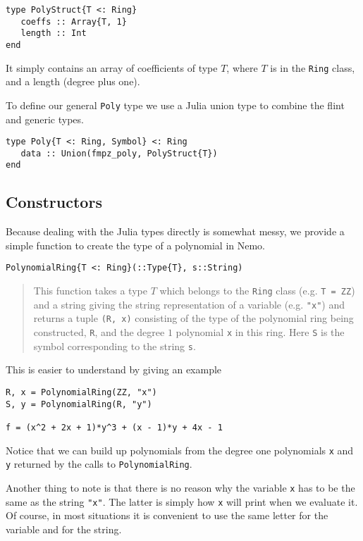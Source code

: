 \documentclass[a4paper,10pt]{article}
\newcommand{\code}{\lstinline}
\newcommand{\desc}[1]{\vspace{-3mm}\begin{quote}#1\end{quote}}
\begin{document}
{{{\begin{lstlisting}
type PolyStruct{T <: Ring}
   coeffs :: Array{T, 1}
   length :: Int
end
\end{lstlisting}

It simply contains an array of coefficients of type $T$, where $T$ is in the \code{Ring}
class, and a length (degree plus one).

To define our general \code{Poly} type we use a Julia union type to combine the flint
and generic types.

\begin{lstlisting}
type Poly{T <: Ring, Symbol} <: Ring
   data :: Union(fmpz_poly, PolyStruct{T})
end
\end{lstlisting}

\subsection{Constructors}

Because dealing with the Julia types directly is somewhat messy, we provide a simple
function to create the type of a polynomial in Nemo.

\begin{lstlisting}
PolynomialRing{T <: Ring}(::Type{T}, s::String)
\end{lstlisting}

\desc{This function takes a type $T$ which belongs to the \code|Ring| class 
(e.g. \code|T = ZZ|) and a string giving the string representation of a variable (e.g. 
\code|"x"|) and returns a tuple \code|(R, x)| consisting of the type of the polynomial
ring being constructed, \code|R|, and the degree $1$ polynomial \code|x| in this ring. 
Here \code|S| is the symbol corresponding to the string \code|s|.}

This is easier to understand by giving an example

\begin{lstlisting}
R, x = PolynomialRing(ZZ, "x")
S, y = PolynomialRing(R, "y")

f = (x^2 + 2x + 1)*y^3 + (x - 1)*y + 4x - 1
\end{lstlisting}

Notice that we can build up polynomials from the degree one polynomials \code{x} and
\code{y} returned by the calls to \code{PolynomialRing}. 

Another thing to note is that there is no reason why the variable \code{x} has to 
be the same as the string \code{"x"}. The latter is simply how \code{x} will print
when we evaluate it. Of course, in most situations it is convenient to use the same 
letter for the variable and for the string.

}}}
\end{document}
